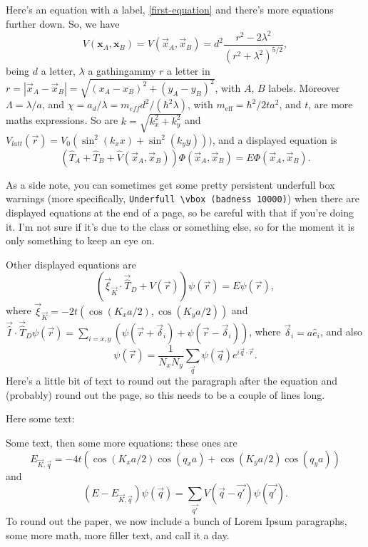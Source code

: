 \documentclass[twoside,british,a4paper]{article}
\begin{document}
Here's an equation with a label, \eqref{first-equation} and there's more equations further down. So, we have
\begin{equation}
V(\mathbf{x}_A,\mathbf{x}_B)=V(\vec{x}_A,\vec{x}_B)=d^2\frac{r^2-2\lambda^2}{(r^2+\lambda^2)^{5/2}},
\label{first-equation}
\end{equation}
being $d$ a letter, $\lambda$ a gathingammy $r$ a letter in $r=|\vec{x}_A-\vec{x}_B|=\sqrt{(x_A-x_B)^2+(y_A-y_B)^2}$, with  $A$, $B$  labels. Moreover $\Lambda=\lambda/a$, and  $\chi = a_{d}/\lambda = m_{eff}d^2/(\hbar^2 \lambda)$, with $m_\mathrm{eff}=\hbar^2/2ta^2$, and $t$, are more maths expressions. So are $k=\sqrt{k_x^2+k_y^2}$ and $V_{latt}(\vec r)= V_0\left(\sin^2(k_x x)+ \sin^2(k_y y)\right))$, and a displayed equation is 
\begin{equation}
\left(\hat{T}_A+\hat{T}_B+{\hat V}(\vec{x}_A,\vec{x}_B)\right)\Phi(\vec{x}_A,\vec{x}_B)=E\Phi(\vec{x}_A,\vec{x}_B).
\end{equation}

As a side note, you can sometimes get some pretty persistent underfull box warnings (more specifically, \verb|Underfull \vbox (badness 10000)|) when there are displayed equations at the end of a page, so be careful with that if you're doing it. I'm not sure if it's due to the class or something else, so for the moment it is only something to keep an eye on.

Other displayed equations are
\begin{equation}
(\vec{\xi}_{\vec{K}}\cdot\vec{\hat{T}}_D+V(\vec{r}))\psi(\vec{r})=E\psi(\vec{r}),
\end{equation}
where $\vec{\xi }_{\vec{K}}=-2t(\cos(K_x a/2),\cos(K_y a/2))$ and $\vec{\hat{I}}\cdot\vec{\hat{T}}_D\psi(\vec{r})=\sum_{i=x,y}\left(\psi(\vec{r}+\vec{\delta}_i)+\psi(\vec{r}-\vec{\delta}_i)\right)$, where $\vec{\delta}_i=a\hat{e}_{i}$, and also
\begin{equation}
\psi(\vec{r})=\frac{1}{N_x N_y}\sum_{\vec{q}}\psi(\vec{q})e^{i\vec{q}\cdot\vec{r}}.
\end{equation}
Here's a little bit of text to round out the paragraph after the equation and (probably) round out the page, so this needs to be a couple of lines long.

Here some text: \lipsum[7] 

Some text, then some more equations: these ones are
$$
E_{\vec{K},\vec{q}}=-4t\left(\cos(K_xa/2)\cos(q_xa)+\cos(K_ya/2)\cos(q_ya)\right)
$$ 
and 
\begin{equation}
(E-E_{\vec{K},\vec{q}})\psi(\vec{q})=\sum_{\vec{q'}}V(\vec{q}-\vec{q'})\psi(\vec{q'}). 
\end{equation}
To round out the paper, we now include a bunch of Lorem Ipsum paragraphs, some more math, more filler text, and call it a day.
\end{document}
